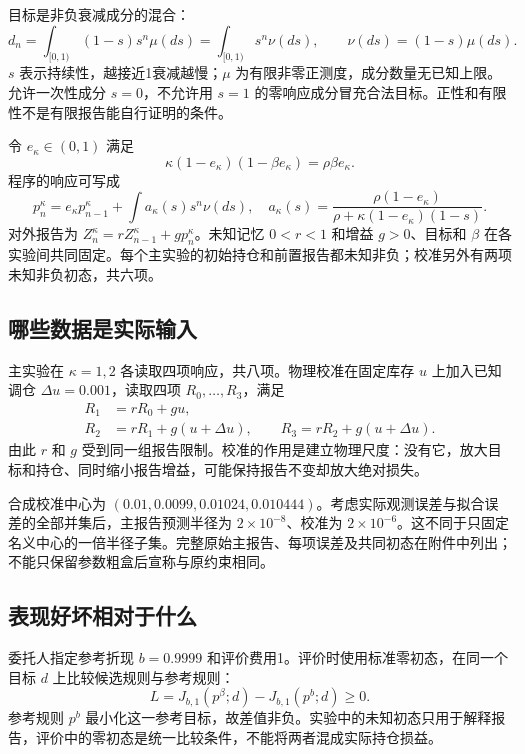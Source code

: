 \documentclass[UTF8,fontset=windows,11pt,a4paper]{ctexart}
\numberwithin{equation}{section}
\begin{document}
目标是非负衰减成分的混合：
\begin{equation}
 d_n=\int_{[0,1)}(1-s)s^n\mu(ds)=\int_{[0,1)}s^n\nu(ds),
 \qquad \nu(ds)=(1-s)\mu(ds).
\end{equation}
$s$ 表示持续性，越接近1衰减越慢；$\mu$ 为有限非零正测度，成分数量无已知上限。允许一次性成分 $s=0$，不允许用 $s=1$ 的零响应成分冒充合法目标。正性和有限性不是有限报告能自行证明的条件。

令 $e_\kappa\in(0,1)$ 满足
\begin{equation}
 \kappa(1-e_\kappa)(1-\beta e_\kappa)=\rho\beta e_\kappa.
\end{equation}
程序的响应可写成
\begin{equation}
 p_n^\kappa=e_\kappa p_{n-1}^\kappa+
 \int a_\kappa(s)s^n\nu(ds),\quad
 a_\kappa(s)=\frac{\rho(1-e_\kappa)}{\rho+\kappa(1-e_\kappa)(1-s)}.
\end{equation}
对外报告为 $Z_n^\kappa=rZ_{n-1}^\kappa+gp_n^\kappa$。未知记忆 $0<r<1$ 和增益 $g>0$、目标和 $\beta$ 在各实验间共同固定。每个主实验的初始持仓和前置报告都未知非负；校准另外有两项未知非负初态，共六项。

\subsection{哪些数据是实际输入}
主实验在 $\kappa=1,2$ 各读取四项响应，共八项。物理校准在固定库存 $u$ 上加入已知调仓 $\Delta u=0.001$，读取四项 $R_0,\ldots,R_3$，满足
\begin{align}
 R_1&=rR_0+gu,\\
 R_2&=rR_1+g(u+\Delta u),\qquad
 R_3=rR_2+g(u+\Delta u).
\end{align}
由此 $r$ 和 $g$ 受到同一组报告限制。校准的作用是建立物理尺度：没有它，放大目标和持仓、同时缩小报告增益，可能保持报告不变却放大绝对损失。

合成校准中心为 $(0.01,0.0099,0.01024,0.010444)$。考虑实际观测误差与拟合误差的全部并集后，主报告预测半径为 $2\times10^{-8}$、校准为 $2\times10^{-6}$。这不同于只固定名义中心的一倍半径子集。完整原始主报告、每项误差及共同初态在附件中列出；不能只保留参数粗盒后宣称与原约束相同。

\subsection{表现好坏相对于什么}
委托人指定参考折现 $b=0.9999$ 和评价费用1。评价时使用标准零初态，在同一个目标 $d$ 上比较候选规则与参考规则：
\begin{equation}\label{eq:loss}
 L=J_{b,1}(p^\beta;d)-J_{b,1}(p^b;d)\ge0.
\end{equation}
参考规则 $p^b$ 最小化这一参考目标，故差值非负。实验中的未知初态只用于解释报告，评价中的零初态是统一比较条件，不能将两者混成实际持仓损益。
\end{document}
